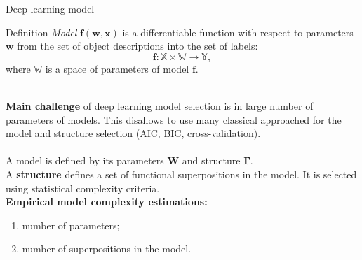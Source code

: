 \documentclass[usenames,dvipsnames,11pt,pdf,utf8,russian,aspectratio=43]{beamer}
\begin{document}
\begin{frame}{Deep learning model}
\small
\begin{block}{Definition}
\textit{Model} $\mathbf{f}(\mathbf{w}, \mathbf{x})$ is a differentiable function with respect to parameters $\mathbf{w}$  from the set of object descriptions into the set of labels:
\[
    \mathbf{f}: \mathbb{X} \times \mathbb{W} \to \mathbb{Y},
\] 
where $\mathbb{W}$ is a space of parameters of model $\mathbf{f}$.
\end{block}
~\\
\textbf{Main challenge} of deep learning model selection is in large number of parameters of models. This disallows to use many classical approached for the model and structure selection (AIC, BIC, cross-validation). \\~\\
A model is defined by its parameters $\mathbf{W}$ and structure $\boldsymbol{\Gamma}$.\\
A \textbf{structure} defines a set of functional superpositions in the model. It is selected using statistical complexity criteria.\\

\textbf{Empirical model complexity estimations:}
\begin{enumerate}
\item number of parameters;
\item number of superpositions in the model.
\end{enumerate}
\end{frame}
\end{document}
